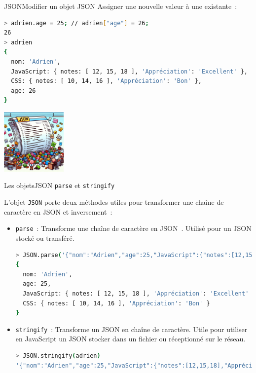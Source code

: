 \documentclass{beamer}
\begin{document}
    \begin{frame}[fragile]{JSON}{Modifier un objet JSON}
        Assigner une nouvelle valeur à une existante~:
        \begin{lstlisting}[language=Bash,title={\tiny{Node.js}}]
> adrien.age = 25; // adrien["age"] = 26;
26
> adrien
{
  nom: 'Adrien',
  JavaScript: { notes: [ 12, 15, 18 ], 'Appréciation': 'Excellent' },
  CSS: { notes: [ 10, 14, 16 ], 'Appréciation': 'Bon' },
  age: 26
}
        \end{lstlisting}
        \begin{center}
            \includegraphics[width=3.2cm]{image/json-changing}
        \end{center}
    \end{frame}

    \begin{frame}[fragile]{Les objets}{JSON \lstinline{parse} et \lstinline{stringify}}
        \begin{footnotesize}
            L'objet \lstinline{JSON} porte deux méthodes utiles pour transformer une chaîne de caractère en JSON et inversement~:
            \begin{itemize}
                \item \lstinline{parse}~: Transforme une chaîne de caractère en JSON~.
                Utilisé pour  un JSON stocké ou transféré.
                \begin{lstlisting}[language=Bash,title={\tiny{Node.js}},basicstyle=\tiny\ttfamily]
> JSON.parse('{"nom":"Adrien","age":25,"JavaScript":{"notes":[12,15,18],"Appréciation":"Excellent"},"CSS":{"notes":[10,14,16],"Appréciation":"Bon"}}')
{
  nom: 'Adrien',
  age: 25,
  JavaScript: { notes: [ 12, 15, 18 ], 'Appréciation': 'Excellent' },
  CSS: { notes: [ 10, 14, 16 ], 'Appréciation': 'Bon' }
}
                \end{lstlisting}
                \item \lstinline{stringify}~: Transforme un JSON en chaîne de caractère.
                Utile pour utiliser en JavaScript un JSON stocker dans un fichier ou réceptionné sur le réseau.
                \begin{lstlisting}[language=Bash,title={\tiny{Node.js}},basicstyle=\tiny\ttfamily]
> JSON.stringify(adrien)
'{"nom":"Adrien","age":25,"JavaScript":{"notes":[12,15,18],"Appréciation":"Excellent"},"CSS":{"notes":[10,14,16],"Appréciation":"Bon"}}'
                \end{lstlisting}
            \end{itemize}
        \end{footnotesize}
    \end{frame}
\end{document}
